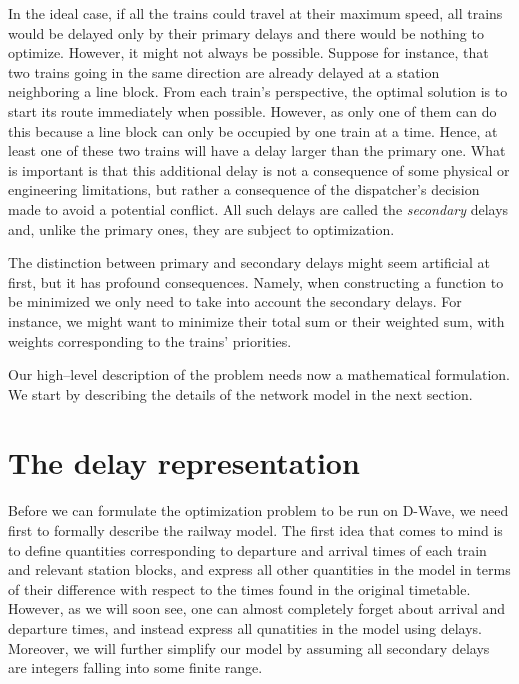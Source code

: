 In the ideal case, if all the trains could travel at their maximum speed, all
trains would be delayed only by their primary delays and there would be nothing
to optimize. However, it might not always be possible. Suppose for instance,
that two trains going in the same direction are already delayed at a station
neighboring a line block. From each train's perspective, the optimal solution
is to start its route immediately when possible. However, as only one of them
can do this because a line block can only be occupied by one train at a time.
Hence, at least one of these two trains will have a delay larger than the
primary one. What is important is that this additional delay is not a
consequence of some physical or engineering limitations, but rather a
consequence of the dispatcher's decision made to avoid a potential conflict.
All such delays are called the \emph{secondary} delays and, unlike the primary
ones, they are subject to optimization.

The distinction between primary and secondary delays might seem artificial at
first, but it has profound consequences. Namely, when constructing a function
to be minimized we only need to take into account the secondary delays. For
instance, we might want to minimize their total sum or their weighted sum, with
weights corresponding to the trains' priorities.

Our high--level description of the problem needs now a mathematical
formulation. We start by describing the details of the network model in the
next section.

\section{The delay representation}
Before we can formulate the optimization problem to be run on D-Wave, we need
first to formally describe the railway model. The first idea that comes to mind
is to define quantities corresponding to departure and arrival times of each
train and relevant station blocks, and express all other quantities in the
model in terms of their difference with respect to the times found in the
original timetable. However, as we will soon see, one can almost completely
forget about arrival and departure times, and instead express all qunatities in
the model using delays. Moreover, we will further simplify our model by
assuming all secondary delays are integers falling into some finite range.

